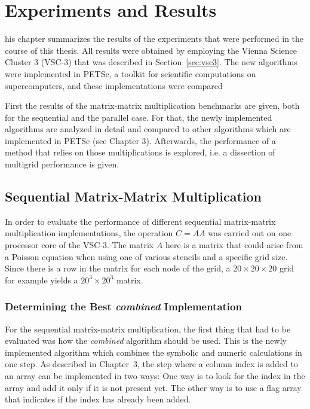 \chapter{Experiments and Results}
his chapter summarizes the results of the experiments that were performed in the course of this thesis. All results were obtained by employing the Vienna Science Cluster 3 (VSC-3) that was described in Section~\ref{sec:vsc3}. The new algorithms were implemented in PETSc, a toolkit for scientific computations on supercomputers, and these implementations were compared 

First the results of the matrix-matrix multiplication benchmarks are given, both for the sequential and the parallel case. For that, the newly implemented algorithms are analyzed in detail and compared to other algorithms which are implemented in PETSc (see Chapter 3). Afterwards, the performance of a method that relies on those multiplications is explored, i.e. a dissection of multigrid performance is given.

\section{Sequential Matrix-Matrix Multiplication}

In order to evaluate the performance of different sequential matrix-matrix multiplication implementations, the operation $C = AA$ was carried out on one processor core of the VSC-3. The matrix $A$ here is a matrix that could arise from a Poisson equation when using one of various stencils and a specific grid size. Since there is a row in the matrix for each node of the grid, a $20\times 20 \times 20$ grid for example yields a $20^3 \times 20^3$ matrix.


\subsection{Determining the Best \textit{combined} Implementation}
For the sequential matrix-matrix multiplication, the first thing that had to be evaluated was how the \textit{combined} algorithm should be used. This is the newly implemented algorithm which combines the symbolic and numeric calculations in one step. As described in Chapter~3, the step where a column index is added to an array can be implemented in two ways: One way is to look for the index in the array and add it only if it is not present yet. The other way is to use a flag array that indicates if the index has already been added. 

